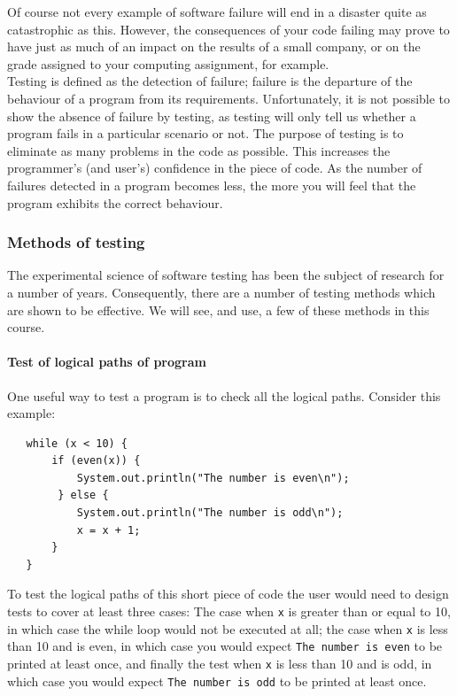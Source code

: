\noindent
Of course not every example of software failure will end in a disaster 
quite as catastrophic as this. However, the consequences of your code failing 
may prove to have just as much of an impact on the results of a small company,
or on the grade assigned to your computing assignment, for example. \\

\noindent
Testing is defined as the detection of failure; failure is the 
departure of the behaviour of a program from its requirements. Unfortunately,
it is not possible to show the absence of failure by testing, as testing 
will only tell us whether a program fails in a particular scenario or not.
The purpose of testing is to eliminate as many problems in the code as 
possible. This  
increases the programmer's (and user's) confidence in the piece of code. As
the number of failures detected in a program becomes less, the more you will 
feel that the program exhibits the correct behaviour.      

\subsubsection{Methods of testing}

The experimental science of software testing has been the subject of research
for a number of years. Consequently, there are a number of testing methods
which are shown to be effective. We will see, and use, a few of these methods
in this course. 

\paragraph{Test of logical paths of program} One useful way to test a program is to check all the logical
paths. Consider this example:

\begin{verbatim}
   while (x < 10) {
       if (even(x)) {
           System.out.println("The number is even\n");
        } else {
           System.out.println("The number is odd\n");
           x = x + 1;
       }
   }
\end{verbatim}

\noindent
To test the logical paths of this short piece of code the user would need 
to design tests to cover at least three cases: The case when {\tt x} is 
greater than or equal to 10, in which case the while loop would not be
executed at all; the case when {\tt x} is less than 10 and is even, in which 
case you would expect {\tt The number is even} to be printed at least once, 
and finally the test when {\tt x} is less than 10 and is odd, in which case 
you would expect {\tt The number is odd} to be printed at least once. \\

